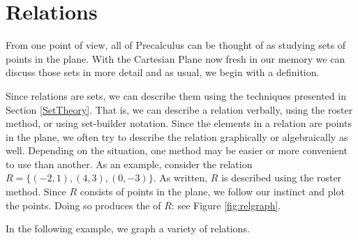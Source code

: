 \section{Relations}
\label{Relations}

From one point of view, all of Precalculus can be thought of as studying sets of points in the plane.  With the Cartesian Plane now fresh in our memory we can discuss those sets in more detail and as usual, we begin with a definition.

\medskip




\medskip

Since relations are sets, we can describe them using the techniques presented in Section \ref{SetTheory}.  That is, we can describe a relation verbally, using the roster method, or using set-builder notation. Since the elements in a relation are points in the plane, we often try to describe the relation graphically or algebraically as well.  Depending on the situation, one method may be easier or more convenient to use than another.  As an example, consider the relation $R = \{ (-2,1),(4,3), (0,-3) \}$.  As written, $R$ is described using the roster method.  Since $R$ consists of points in the plane, we follow our instinct and plot the points.  Doing so produces the    of $R$: see Figure \ref{fig:relgraph}.


In the following example, we graph a variety of relations.


